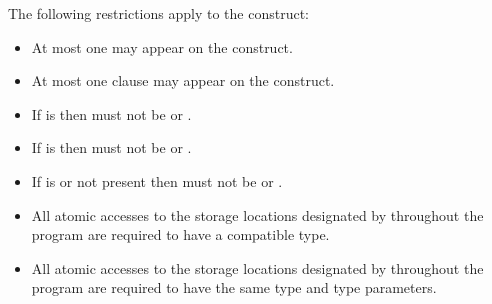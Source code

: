 \begin{samepage}


\restrictions

The following restrictions apply to the  construct:

\begin{itemize}
\item At most one  may appear on the construct.

\item At most one  clause may appear on the construct.

\item If  is  then 
    must not be  or .

\item If  is  then 
    must not be  or .

\item If  is  or not present then 
    must not be  or .
\end{itemize}

\newpage  %
\begin{ccppspecific}
\begin{itemize}
\item All atomic accesses to the storage locations designated by  throughout the program
are required to have a compatible type.
\end{itemize}
\end{ccppspecific}
\end{samepage}

\begin{fortranspecific}
\begin{itemize}
\item All atomic accesses to the storage locations designated by  throughout the program
are required to have the same type and type parameters.
\end{itemize}
\end{fortranspecific}


